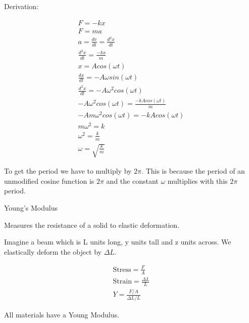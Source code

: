 \documentclass{report}
\begin{document}
\begin{description}
\begin{mdframed}
            Derivation:
            \begin{mdframed}
                \begin{gather}
                   F = -kx\\ 
                   F = ma\\
                   a = \frac{dv}{dt} = \frac{d^2x}{dt}\\
                   \frac{d^2x}{dt} = \frac{-kx}{m}\\
                   x = A cos(\omega t)\\
                   \frac{dx}{dt} = -A\omega sin(\omega t)\\
                   \frac{d^2x}{dt} = -A\omega^2 cos(\omega t)\\
                   -A\omega^2 cos(\omega t) = \frac{-kAcos(\omega t)}{m}\\
                   -Am\omega^2 cos(\omega t) = -kAcos(\omega t)\\ 
                   m\omega^2 = k\\
                   \omega^2 = \frac{k}{m}\\
                   \omega = \sqrt{\frac{k}{m}}
                \end{gather}

                To get the period we have to multiply
                by $2\pi$. This is because the period
                of an unmodified cosine function is
                 $2\pi$ and the constant  $\omega$ multiplies
                 with this  $2\pi$ period.
            \end{mdframed}
        \end{mdframed}
    \item {\large Young's Modulus}
        \begin{mdframed}
            Measures the resistance of a solid to elastic
            deformation.

            Imagine a beam which is L units long, y units
            tall and z units across. We elastically deform
            the object by $\Delta L$.

            \begin{gather}
                \textrm{Stress} = \frac{F}{A}\\
                \textrm{Strain} = \frac{\Delta L}{L}\\
                Y = \frac{F/A}{\Delta L/L}
            \end{gather}

            All materials have a Young Modulus.


\end{mdframed}
\end{description}
\end{document}
